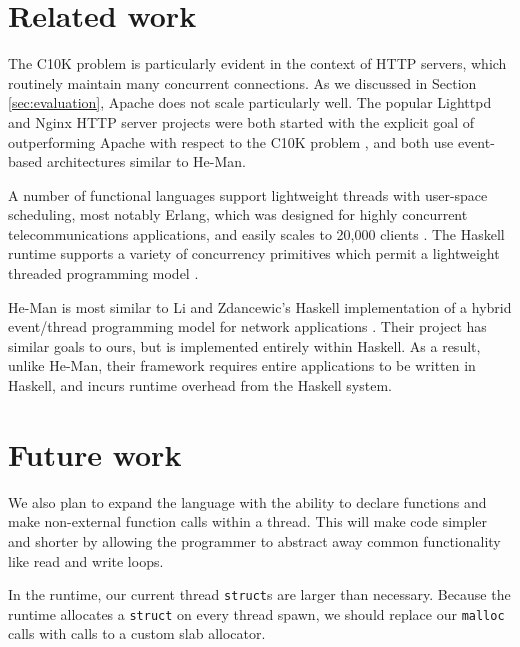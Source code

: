 \documentclass[preprint]{sigplanconf}
\renewcommand{\t}{\texttt}
\begin{document}

\section{Related work}

The C10K problem is particularly evident in the context of HTTP
servers, which routinely maintain many concurrent connections. As we
discussed in Section \ref{sec:evaluation}, Apache does not scale
particularly well. The popular Lighttpd and Nginx HTTP server projects
were both started with the explicit goal of outperforming Apache with
respect to the C10K problem \cite{Lighttpd,Nginx}, and both use
event-based architectures similar to He-Man.

A number of functional languages support lightweight threads with
user-space scheduling, most notably Erlang, which was designed for
highly concurrent telecommunications applications, and easily scales
to 20,000 clients \cite{Hellstrom}. The Haskell runtime supports a
variety of concurrency primitives which permit a lightweight threaded
programming model \cite{LiEtAl}.


He-Man is most similar to Li and Zdancewic's Haskell implementation of
a hybrid event/thread programming model for network applications
\cite{LiZdancewic}.  Their project has similar goals to ours, but is
implemented entirely within Haskell. As a result, unlike He-Man, their
framework requires entire applications to be written in Haskell, and
incurs runtime overhead from the Haskell system.


\section{Future work}

We also plan to expand the language with the ability to declare functions and
make non-external function calls within a thread. This will make code simpler
and shorter by allowing the programmer to abstract away common functionality
like read and write loops.

In the runtime, our current thread \t{struct}s are larger than necessary.
Because the runtime allocates a \t{struct} on every thread spawn, we should
replace our \t{malloc} calls with calls to a custom slab allocator.
\end{document}
